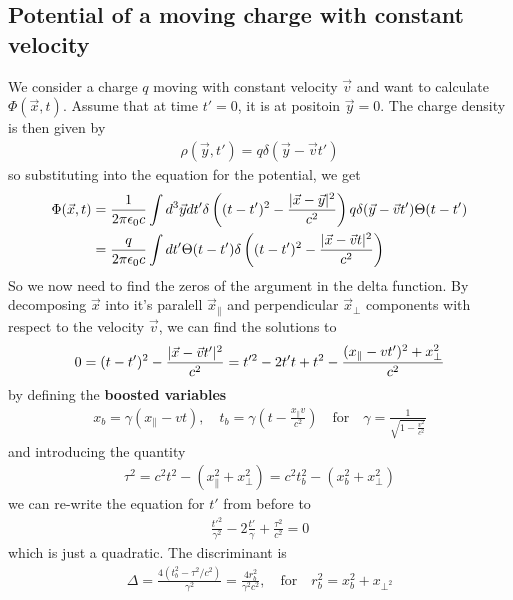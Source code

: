 \subsection{Potential of a moving charge with constant velocity}
We consider a charge $q$ moving with constant velocity $\vec{v}$
and want to calculate $\Phi(\vec{x},t)$.
Assume that at time $t' = 0$, it is at positoin $\vec{y} = 0$.
The charge density is then given by
\begin{align*}
  \rho(\vec{y},t') = q \delta(\vec{y} - \vec{v} t')
\end{align*}
so substituting into the equation for the potential, we get
\begin{align*}
  \Phi(\vec{x},t) 
  &= 
  \frac{1}{2 \pi \epsilon_0 c}
  \int d^{3}\vec{y} dt'
  \delta\left(
    (t - t')^{2}
    -
    \frac{\vert\vec{x}-\vec{y}\vert^{2}}{c^{2}}
  \right)
  q\delta(\vec{y} - \vec{v} t')
  \Theta(t - t')\\
  &=
  \frac{q}{2 \pi \epsilon_0 c}
  \int dt' \Theta(t-t')
  \delta\left(
  (t -t')^{2} - \frac{\vert\vec{x} - \vec{v}t\vert^{2}}{c^{2}}
\right)
\end{align*}
So we now need to find the zeros of the argument in the delta function.
By decomposing $\vec{x}$ into it's paralell $\vec{x}_{\parallel}$ and perpendicular $\vec{x}_{\bot}$ components with respect to the velocity $\vec{v}$, we can find the solutions to
\begin{align*}
  0 = (t -t')^{2} - \frac{\vert\vec{x} - \vec{v}t'\vert^{2}}{c^{2}} =
  t'^{2} - 2t't + t^{2} - \frac{(x_{\parallel} - v t')^{2} + x_{\bot}^{2}}{c^{2}}
\end{align*}
by defining the \textbf{boosted variables}
\begin{align*}
  x_b = \gamma(x_{\parallel} - vt), \quad t_b = \gamma \left(
    t - \frac{x_{\parallel}v}{c^{2}} 
  \right)
    \quad \text{for} \quad \gamma = \frac{1}{\sqrt{1 - \tfrac{v^{2}}{c^{2}}}}
\end{align*}
and introducing the quantity
\begin{align*}
  \tau^{2} = c^{2} t^{2} - (x_{\parallel}^{2} + x_{\bot}^{2}) = c^{2} t_b^{2} - (x_b^{2} + x_{\bot}^{2})
\end{align*}
we can re-write the equation for $t'$ from before to 
\begin{align*}
  \frac{t'^{2}}{\gamma^{2}} - 2 \frac{t'}{\gamma} + \frac{\tau^{2}}{c^{2}} = 0
\end{align*}
which is just a quadratic. The discriminant is
\begin{align*}
  \Delta =  \frac{4(t_b^{2} - \tau^{2}/c^{2})}{\gamma^{2}} = \frac{4 r_b^{2}}{\gamma^{2}c^{2}}, \quad \text{for} \quad r_b^{2} = x_b^{2} + x_{\bot^{2}}
\end{align*}
